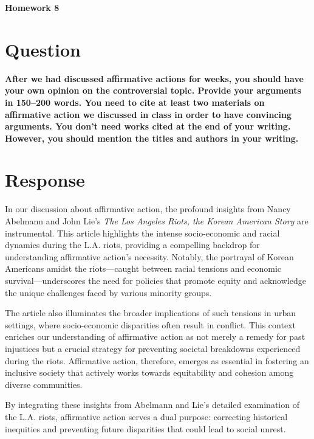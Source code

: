 \documentclass[12pt]{article}
\begin{document}
\begin{center}
  \Large \textbf{Homework 8}
\end{center}

\section*{Question}
\textbf{After we had discussed affirmative actions for weeks, you should have your own opinion on the controversial topic. Provide your arguments in 150–200 words. You need to cite at least two materials on affirmative action we discussed in class in order to have convincing arguments. You don't need works cited at the end of your writing. However, you should mention the titles and authors in your writing.}

\section*{Response}
In our discussion about affirmative action, the profound insights from Nancy Abelmann and John Lie's \textit{The Los Angeles Riots, the Korean American Story} are instrumental. This article highlights the intense socio-economic and racial dynamics during the L.A. riots, providing a compelling backdrop for understanding affirmative action's necessity. Notably, the portrayal of Korean Americans amidst the riots—caught between racial tensions and economic survival—underscores the need for policies that promote equity and acknowledge the unique challenges faced by various minority groups.

The article also illuminates the broader implications of such tensions in urban settings, where socio-economic disparities often result in conflict. This context enriches our understanding of affirmative action as not merely a remedy for past injustices but a crucial strategy for preventing societal breakdowns experienced during the riots. Affirmative action, therefore, emerges as essential in fostering an inclusive society that actively works towards equitability and cohesion among diverse communities.

By integrating these insights from Abelmann and Lie's detailed examination of the L.A. riots, affirmative action serves a dual purpose: correcting historical inequities and preventing future disparities that could lead to social unrest.

\end{document}
